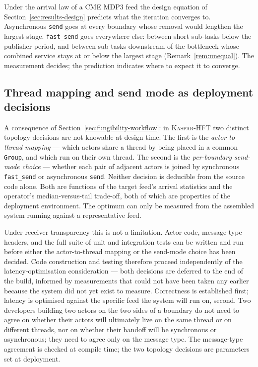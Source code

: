 \documentclass[11pt]{article}
\newcommand{\kasparhft}{\textsc{Kaspar-HFT}}
\begin{document}
Under the arrival law of a CME MDP3 feed the design equation of
Section~\ref{sec:results-design} predicts what the iteration converges to. Asynchronous
\texttt{send} goes at every boundary whose removal would lengthen the largest stage.
\texttt{fast\_send} goes everywhere else: between short sub-tasks below the publisher
period, and between sub-tasks downstream of the bottleneck whose combined service stays at
or below the largest stage (Remark~\ref{rem:unequal}). The measurement decides; the prediction indicates where to expect it to converge.

\subsection{Thread mapping and send mode as deployment decisions}
\label{sec:fungibility-decoupling}

A consequence of Section~\ref{sec:fungibility-workflow}: in \kasparhft{} two distinct
topology decisions are not knowable at design time.
The first is the \emph{actor-to-thread mapping} --- which actors share a thread by being
placed in a common \texttt{Group}, and which run on their own thread. The second is the
\emph{per-boundary send-mode choice} --- whether each pair of adjacent actors is joined by
synchronous \texttt{fast\_send} or asynchronous \texttt{send}. Neither decision is
deducible from the source code alone. Both are functions of the target feed's arrival
statistics and the operator's median-versus-tail trade-off, both of which are properties of
the deployment environment. The optimum can only be measured from the assembled system
running against a representative feed.

Under receiver transparency this is not a limitation. Actor code,
message-type headers, and the full suite of unit and integration tests can be written and
run before either the actor-to-thread mapping or the send-mode choice has been decided.
Code construction and testing therefore proceed independently of the latency-optimisation
consideration --- both decisions are deferred to the end of the build, informed by
measurements that could not have been taken any earlier because the system did not yet
exist to measure. Correctness is established first; latency is optimised against the
specific feed the system will run on, second. Two developers building two actors on the
two sides of a boundary do not need to agree on whether their actors will ultimately live
on the same thread or on different threads, nor on whether their handoff will be
synchronous or asynchronous; they need to agree only on the message type. The message-type agreement is checked at compile time; the two topology decisions are
parameters set at deployment.
\end{document}
